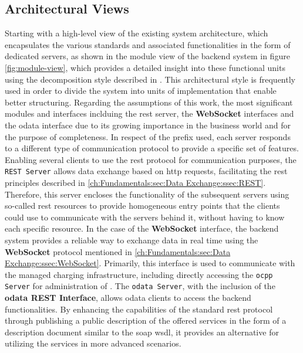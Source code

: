 \subsection{Architectural Views}
\label{ch:Implementation:sec:Reservation System:ssec:System Architecture}

Starting with a high-level view of the existing system architecture, which encapsulates the various standards and associated functionalities in the form of dedicated servers, as shown in the module view of the backend system in figure \ref{fig:module-view}, which provides a detailed insight into these functional units using the decomposition style described in \cite[p.~67]{clements_documenting_2011}. This architectural style is frequently used in order to divide the system into units of implementation that enable better structuring.
Regarding the assumptions of this work, the most significant modules and interfaces inclduing the \acrshort{rest} server, the \textbf{WebSocket} interfaces and the \acrshort{odata} interface due to its growing importance in the business world and for the purpose of completeness.
In respect of the prefix used, each server responds to a different type of communication protocol to provide a specific set of features.
Enabling several clients to use the \acrshort{rest} protocol for communication purposes, the \texttt{REST Server} allows data exchange based on \acrshort{http} requests, facilitating the \acrshort{rest} principles described in \ref{ch:Fundamentals:sec:Data Exchange:ssec:REST}. 
Therefore, this server encloses the functionality of the subsequent servers using so-called \acrshort{rest} resources to provide homogeneous entry points that the clients could use to communicate with the servers behind it, without having to know each specific resource. 
In the case of the \textbf{WebSocket} interface, the backend system provides a reliable way to exchange data in real time using the \textbf{WebSocket} protocol mentioned in \ref{ch:Fundamentals:sec:Data Exchange:ssec:WebSocket}. 
Primarily, this interface is used to communicate with the managed charging infrastructure, including directly accessing the \texttt{\acrshort{ocpp} Server} for administration of .
The \texttt{\acrshort{odata} Server}, with the inclusion of the \textbf{\acrshort{odata} REST Interface}, allows \acrshort{odata} clients to access the backend functionalities. By enhancing the capabilities of the standard \acrshort{rest} protocol through publishing a public description of the offered services in the form of a description document similar to the \acrshort{soap} \acrshort{wsdl}, it provides an alternative for utilizing the services in more advanced scenarios.

